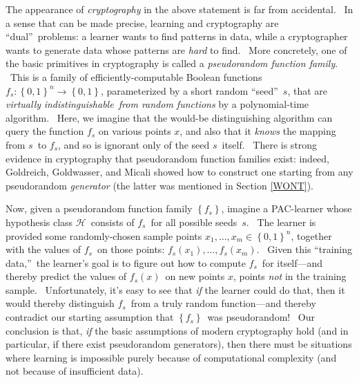 \documentclass[12pt,onecolumn]{article}%
\begin{document}
The appearance of \textit{cryptography} in the above statement is far from
accidental. \ In a sense that can be made precise, learning and cryptography
are \textquotedblleft dual\textquotedblright\ problems: a learner wants to
find patterns in data, while a cryptographer wants to generate data whose
patterns are \textit{hard} to find. \ More concretely, one of the basic
primitives in cryptography is called a \textit{pseudorandom function family}.
\ This is a family of efficiently-computable Boolean functions $f_{s}:\left\{
0,1\right\}  ^{n}\rightarrow\left\{  0,1\right\}  $, parameterized by a short
random \textquotedblleft seed\textquotedblright\ $s$, that are
\textit{virtually} \textit{indistinguishable\ from random functions} by a
polynomial-time algorithm. \ Here, we imagine that the would-be distinguishing
algorithm can query the function $f_{s}$ on various points $x$, and also that
it \textit{knows} the mapping from $s$\ to $f_{s}$, and so is ignorant only of
the seed $s$\ itself. \ There is strong evidence in cryptography that
pseudorandom function families exist: indeed, Goldreich, Goldwasser, and
Micali \cite{ggm} showed how to construct one starting from any pseudorandom
\textit{generator} (the latter was mentioned in Section \ref{WONT}).

Now, given a pseudorandom function family $\left\{  f_{s}\right\}  $, imagine
a PAC-learner whose hypothesis class $\mathcal{H}$\ consists of $f_{s}$\ for
all possible seeds\ $s$. \ The learner is provided some randomly-chosen sample
points $x_{1},\ldots,x_{m}\in\left\{  0,1\right\}  ^{n}$, together with the
values of $f_{s}$\ on those points: $f_{s}\left(  x_{1}\right)  ,\ldots
,f_{s}\left(  x_{m}\right)  $. \ Given this \textquotedblleft training
data,\textquotedblright\ the learner's goal is to figure out how to compute
$f_{s}$\ for itself---and thereby predict the values of $f_{s}\left(
x\right)  $\ on new points $x$, points \textit{not} in the training sample.
\ Unfortunately, it's easy to see that \textit{if} the learner could do that,
then it would thereby distinguish $f_{s}$\ from a truly random function---and
thereby contradict our starting assumption that $\left\{  f_{s}\right\}
$\ was pseudorandom! \ Our conclusion is that, \textit{if} the basic
assumptions of modern cryptography hold (and in particular, if there exist
pseudorandom generators), then there must be situations where learning is
impossible purely because of computational complexity (and not because of
insufficient data).
\end{document}
